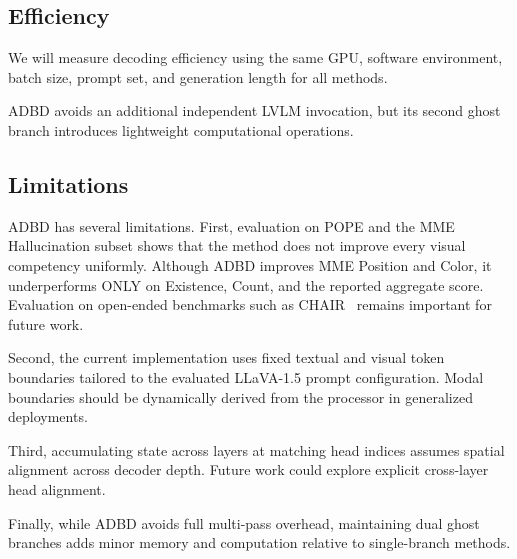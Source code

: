\subsection{Efficiency}
\label{subsec:efficiency}

We will measure decoding efficiency using the same GPU, software environment, batch size, prompt set, and generation length for all methods.

ADBD avoids an additional independent LVLM invocation, but its second ghost branch introduces lightweight computational operations.

\subsection{Limitations}
\label{sec:limitations}

ADBD has several limitations. First, evaluation on POPE and the MME Hallucination subset shows that the method does not improve every visual competency uniformly. Although ADBD improves MME Position and Color, it underperforms ONLY on Existence, Count, and the reported aggregate score. Evaluation on open-ended benchmarks such as CHAIR~\cite{rohrbach2018object} remains important for future work.

Second, the current implementation uses fixed textual and visual token boundaries tailored to the evaluated LLaVA-1.5 prompt configuration. Modal boundaries should be dynamically derived from the processor in generalized deployments.

Third, accumulating state across layers at matching head indices assumes spatial alignment across decoder depth. Future work could explore explicit cross-layer head alignment.

Finally, while ADBD avoids full multi-pass overhead, maintaining dual ghost branches adds minor memory and computation relative to single-branch methods.
